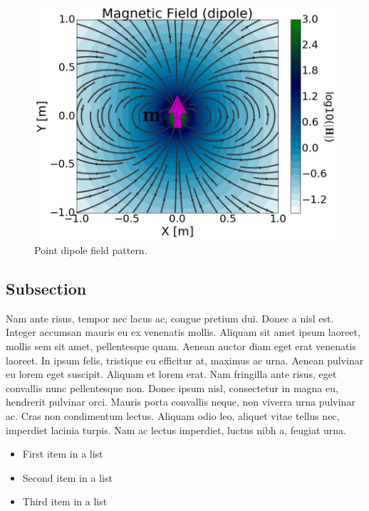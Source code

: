 \documentclass[10pt, a4paper, twocolumn]{article} %
\begin{document}
\begin{figure}
	\includegraphics[width=\linewidth]{Figures/dipole_field.png} %
	\caption{Point dipole field pattern.} %
	\label{Dipole} %
\end{figure}


\subsection{Subsection}

Nam ante risus, tempor nec lacus ac, congue pretium dui. Donec a nisl est. Integer accumsan mauris eu ex venenatis mollis. Aliquam sit amet ipsum laoreet, mollis sem sit amet, pellentesque quam. Aenean auctor diam eget erat venenatis laoreet. In ipsum felis, tristique eu efficitur at, maximus ac urna. Aenean pulvinar eu lorem eget suscipit. Aliquam et lorem erat. Nam fringilla ante risus, eget convallis nunc pellentesque non. Donec ipsum nisl, consectetur in magna eu, hendrerit pulvinar orci. Mauris porta convallis neque, non viverra urna pulvinar ac. Cras non condimentum lectus. Aliquam odio leo, aliquet vitae tellus nec, imperdiet lacinia turpis. Nam ac lectus imperdiet, luctus nibh a, feugiat urna.

\begin{itemize}
	\item First item in a list 
	\item Second item in a list 
	\item Third item in a list
\end{itemize}
\end{document}
